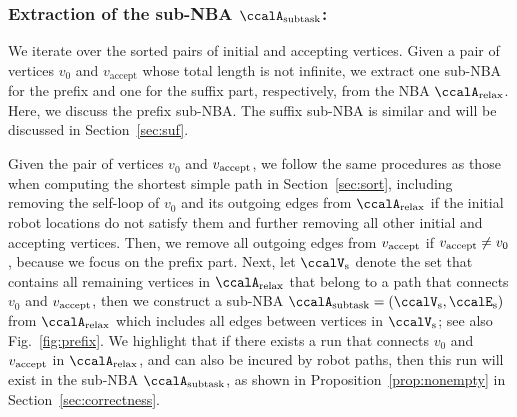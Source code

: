 \documentclass[Afour,sageh,times]{sagej}
\newcommand{\auto}[1]{\ccalA_{\textup{#1}}}
\newcommand{\vertex}[1]{v_{\textup{#1}}}
\begin{document}


  \subsubsection{Extraction of the sub-NBA \upshape $\auto{subtask}$:}\label{sub-NBA:1}
We iterate over the sorted pairs of initial and accepting vertices. Given a pair of vertices  $v_0$ and $v_\text{accept}$ whose total length is not infinite,  we extract one sub-NBA for the prefix and one for the suffix part, respectively, from  the NBA $\auto{relax}$.  Here, we discuss the prefix sub-NBA. The suffix sub-NBA is similar and will be  discussed in Section~\ref{sec:suf}.

Given the pair of vertices $v_0$ and $\vertex{accept}$, we follow the same procedures as those when computing the shortest simple path in Section~\ref{sec:sort}, including removing the self-loop of $v_0$ and its outgoing edges from $\auto{relax}$ if the initial robot locations do not satisfy them and further removing all other initial and accepting vertices. Then, we remove all outgoing edges from $\vertex{accept}$ if $\vertex{accept} \not=v_0$, because we focus on the prefix part. Next, let $\ccalV_{\text{s}}$ denote the set that contains all remaining vertices in $ \auto{relax}$ that belong to a path that connects $v_0$ and $\vertex{accept}$, then we construct a sub-NBA $\auto{subtask}=(\ccalV_{\text{s}}, \ccalE_\text{s})$ from $\auto{relax}$ which includes all edges between vertices in $\ccalV_{\text{s}}$; see also Fig.~\ref{fig:prefix}. We highlight that if there exists a run that connects $v_0$ and $\vertex{accept}$ in $\auto{relax}$, and can also be incured by robot paths, then this run will exist in the sub-NBA $\auto{subtask}$, as shown in Proposition~\ref{prop:nonempty} in Section~\ref{sec:correctness}.
\end{document}

